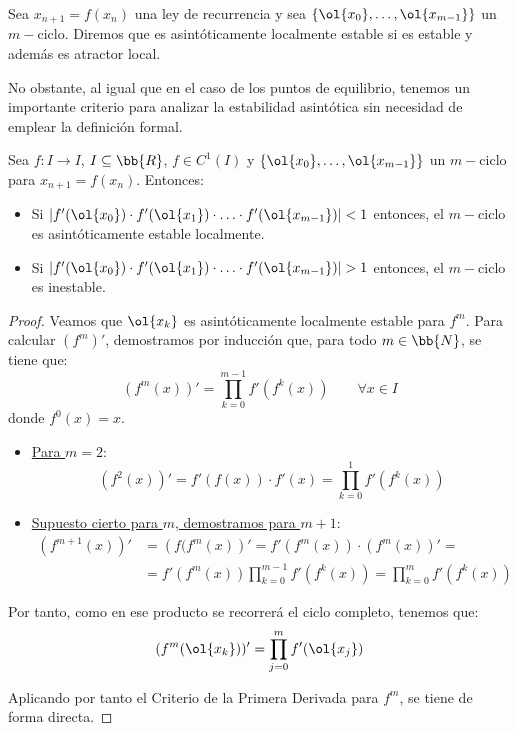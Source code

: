 \begin{definicion}
    Sea $x_{n+1} = f(x_n)$ una ley de recurrencia y sea $\{\ol{x_0}, \ldots, \ol{x_{m-1}}\}$ un $m-$ciclo. Diremos que es asintóticamente localmente estable si es estable y además es atractor local.
\end{definicion}

No obstante, al igual que en el caso de los puntos de equilibrio, tenemos un importante criterio para analizar la estabilidad asintótica sin necesidad de emplear la definición formal.
\begin{teo}
    Sea $f:I\rightarrow I$, $I \subseteq \bb{R}$, $f \in C^1(I)$ y $\{\ol{x_0}, \ldots, \ol{x_{m-1}}\}$ un $m-$ciclo para $x_{n+1} = f(x_n)$. Entonces:
    \begin{itemize}
        \item Si $|f'(\ol{x_0})\cdot f'(\ol{x_1})\cdot \ldots \cdot f'(\ol{x_{m-1}})| < 1$ entonces, el $m-$ciclo es asintóticamente estable localmente.
        \item Si $|f'(\ol{x_0})\cdot f'(\ol{x_1})\cdot \ldots \cdot f'(\ol{x_{m-1}})| > 1$ entonces, el $m-$ciclo es inestable.
    \end{itemize}
\end{teo}
\begin{proof}
    Veamos que $\ol{x_k}$ es asintóticamente localmente estable para $f^m$. Para calcular $(f^m)'$, demostramos por inducción que, para todo $m\in \bb{N}$, se tiene que:
    \begin{equation*}
        (f^m(x))' = \prod_{k=0}^{m-1} f'(f^k(x)) \qquad \forall x\in I
    \end{equation*}
    donde $f^0(x)=x$.
    \begin{itemize}
        \item \ul{Para $m=2$}:
        \begin{equation*}
            (f^2(x))' = f'(f(x))\cdot f'(x) = \prod_{k=0}^{1} f'(f^k(x))
        \end{equation*}

        \item \ul{Supuesto cierto para $m$, demostramos para $m+1$}:
        \begin{align*}
            (f^{m+1}(x))' &= \left(f(f^m(x)\right)'
            = f'(f^m(x))\cdot (f^m(x))'
            =\\&= f'(f^m(x)) \prod_{k=0}^{m-1} f'(f^k(x))
            = \prod_{k=0}^{m} f'(f^k(x))
        \end{align*}
    \end{itemize}

    Por tanto, como en ese producto se recorrerá el ciclo completo, tenemos que:
    \begin{equation*}
        (f^m(\ol{x_k}))' = \prod_{j=0}^{m} f'(\ol{x_j})
    \end{equation*}

    Aplicando por tanto el Criterio de la Primera Derivada para $f^m$, se tiene de forma directa.
\end{proof}

